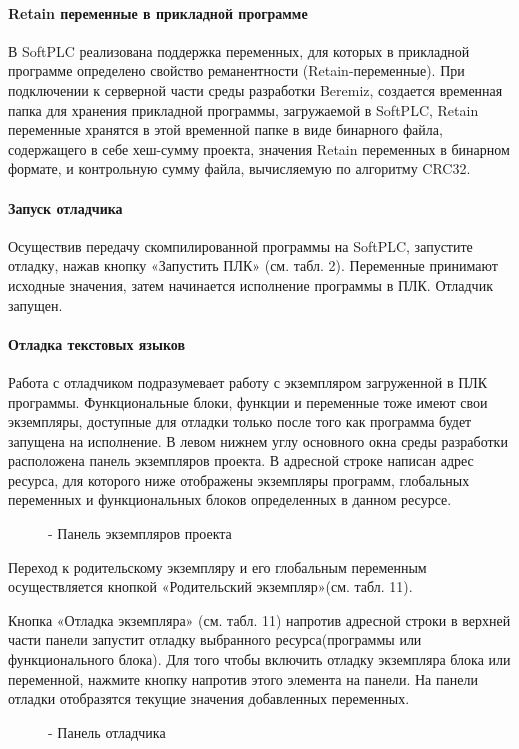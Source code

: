 \documentclass[letterpaper,10pt,russian]{sphinxmanual}
\begin{document}
\paragraph{Retain переменные в прикладной программе}
\label{usage_guide/work_with_project:retain}
В SoftPLC реализована поддержка переменных, для которых в прикладной
программе определено свойство реманентности (Retain-переменные). При
подключении к серверной части среды разработки Beremiz, создается
временная папка для хранения прикладной программы, загружаемой в
SoftPLC, Retain переменные хранятся в этой временной папке в виде
бинарного файла, содержащего в себе хеш-сумму проекта, значения Retain
переменных в бинарном формате, и контрольную сумму файла, вычисляемую по
алгоритму CRC32.


\paragraph{Запуск отладчика}
\label{usage_guide/work_with_project:id18}
Осуществив передачу скомпилированной программы на SoftPLC, запустите
отладку, нажав кнопку «Запустить ПЛК» (см. табл. 2).
Переменные принимают исходные значения, затем
начинается исполнение программы в ПЛК. Отладчик запущен.


\paragraph{Отладка текстовых языков}
\label{usage_guide/work_with_project:id19}
Работа с отладчиком подразумевает работу с экземпляром загруженной в ПЛК
программы. Функциональные блоки, функции и переменные тоже имеют свои
экземпляры, доступные для отладки только после того как программа будет
запущена на исполнение. В левом нижнем углу основного окна среды
разработки расположена панель экземпляров проекта.
В адресной строке написан адрес ресурса, для которого ниже отображены
экземпляры программ, глобальных переменных и функциональных блоков
определенных в данном ресурсе.
\begin{figure}[htbp]
\centering
\capstart

\noindent{}
\caption{- Панель экземпляров проекта}\label{usage_guide/work_with_project:image214}\end{figure}

Переход к родительскому экземпляру и его глобальным переменным
осуществляется кнопкой «Родительский экземпляр»(см. табл. 11).

Кнопка «Отладка экземпляра» (см. табл. 11) напротив адресной строки в
верхней части панели запустит отладку выбранного ресурса(программы или
функционального блока). Для того чтобы включить отладку экземпляра блока
или переменной, нажмите кнопку напротив этого элемента на панели. На
панели отладки отобразятся текущие значения добавленных переменных.
\begin{figure}[htbp]
\centering
\capstart

\noindent{}
\caption{- Панель отладчика}\label{usage_guide/work_with_project:image215}\end{figure}
\end{document}
